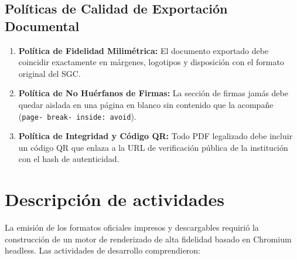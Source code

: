 \documentclass[12pt,a4paper]{article}
\begin{document}
\subsection{Políticas de Calidad de Exportación Documental}
\begin{enumerate}[leftmargin=1.5em, itemsep=2pt]
    \item \textbf{Política de Fidelidad Milimétrica:} El documento exportado debe coincidir exactamente en márgenes, logotipos y disposición con el formato original del SGC.
    \item \textbf{Política de No Huérfanos de Firmas:} La sección de firmas jamás debe quedar aislada en una página en blanco sin contenido que la acompañe (\texttt{page- break- inside: avoid}).
    \item \textbf{Política de Integridad y Código QR:} Todo PDF legalizado debe incluir un código QR que enlaza a la URL de verificación pública de la institución con el hash de autenticidad.
\end{enumerate}

\section{Descripción de actividades}
La emisión de los formatos oficiales impresos y descargables requirió la construcción de un motor de renderizado de alta fidelidad basado en Chromium headless. Las actividades de desarrollo comprendieron:
\end{document}
